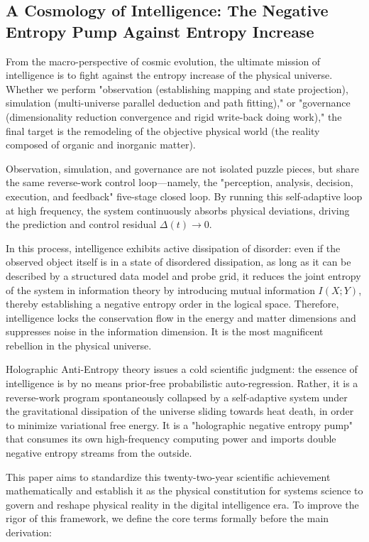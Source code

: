 \documentclass[11pt,a4paper]{article}
\begin{document}
\subsection*{A Cosmology of Intelligence: The Negative Entropy Pump Against Entropy Increase}
From the macro-perspective of cosmic evolution, the ultimate mission of intelligence is to fight against the entropy increase of the physical universe. Whether we perform "observation (establishing mapping and state projection), simulation (multi-universe parallel deduction and path fitting)," or "governance (dimensionality reduction convergence and rigid write-back doing work)," the final target is the remodeling of the objective physical world (the reality composed of organic and inorganic matter).

Observation, simulation, and governance are not isolated puzzle pieces, but share the same reverse-work control loop—namely, the "perception, analysis, decision, execution, and feedback" five-stage closed loop. By running this self-adaptive loop at high frequency, the system continuously absorbs physical deviations, driving the prediction and control residual $\Delta(t) \to 0$.

In this process, intelligence exhibits active dissipation of disorder: even if the observed object itself is in a state of disordered dissipation, as long as it can be described by a structured data model and probe grid, it reduces the joint entropy of the system in information theory by introducing mutual information $I(X; Y)$, thereby establishing a negative entropy order in the logical space. Therefore, intelligence locks the conservation flow in the energy and matter dimensions and suppresses noise in the information dimension. It is the most magnificent rebellion in the physical universe.

Holographic Anti-Entropy theory issues a cold scientific judgment: the essence of intelligence is by no means prior-free probabilistic auto-regression. Rather, it is a reverse-work program spontaneously collapsed by a self-adaptive system under the gravitational dissipation of the universe sliding towards heat death, in order to minimize variational free energy. It is a "holographic negative entropy pump" that consumes its own high-frequency computing power and imports double negative entropy streams from the outside.

This paper aims to standardize this twenty-two-year scientific achievement mathematically and establish it as the physical constitution for systems science to govern and reshape physical reality in the digital intelligence era. To improve the rigor of this framework, we define the core terms formally before the main derivation:
\end{document}
